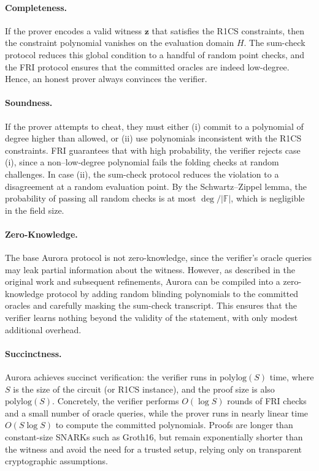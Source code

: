 \paragraph{Completeness.}
If the prover encodes a valid witness $\mathbf{z}$ that satisfies the R1CS constraints, 
then the constraint polynomial vanishes on the evaluation domain $H$. 
The sum-check protocol reduces this global condition to a handful of random point checks, 
and the FRI protocol ensures that the committed oracles are indeed low-degree. 
Hence, an honest prover always convinces the verifier.

\paragraph{Soundness.}
If the prover attempts to cheat, they must either (i) commit to a polynomial of degree higher than allowed, 
or (ii) use polynomials inconsistent with the R1CS constraints. 
FRI guarantees that with high probability, the verifier rejects case (i), 
since a non–low-degree polynomial fails the folding checks at random challenges. 
In case (ii), the sum-check protocol reduces the violation to a disagreement at a random evaluation point. 
By the Schwartz–Zippel lemma, the probability of passing all random checks is at most $\deg/|\mathbb{F}|$, 
which is negligible in the field size. 

\paragraph{Zero-Knowledge.}
The base Aurora protocol is not zero-knowledge, 
since the verifier’s oracle queries may leak partial information about the witness. 
However, as described in the original work and subsequent refinements, 
Aurora can be compiled into a zero-knowledge protocol by adding random blinding polynomials 
to the committed oracles and carefully masking the sum-check transcript. 
This ensures that the verifier learns nothing beyond the validity of the statement, 
with only modest additional overhead.

\paragraph{Succinctness.}
Aurora achieves succinct verification: the verifier runs in $\mathrm{polylog}(S)$ time, 
where $S$ is the size of the circuit (or R1CS instance), 
and the proof size is also $\mathrm{polylog}(S)$. 
Concretely, the verifier performs $O(\log S)$ rounds of FRI checks and a small number of oracle queries, 
while the prover runs in nearly linear time $O(S \log S)$ to compute the committed polynomials. 
Proofs are longer than constant-size SNARKs such as Groth16, 
but remain exponentially shorter than the witness and avoid the need for a trusted setup, 
relying only on transparent cryptographic assumptions.


